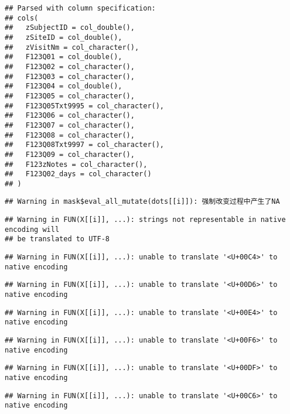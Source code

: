 \documentclass[
]{article}
\begin{document}
\begin{verbatim}
## Parsed with column specification:
## cols(
##   zSubjectID = col_double(),
##   zSiteID = col_double(),
##   zVisitNm = col_character(),
##   F123Q01 = col_double(),
##   F123Q02 = col_character(),
##   F123Q03 = col_character(),
##   F123Q04 = col_double(),
##   F123Q05 = col_character(),
##   F123Q05Txt9995 = col_character(),
##   F123Q06 = col_character(),
##   F123Q07 = col_character(),
##   F123Q08 = col_character(),
##   F123Q08Txt9997 = col_character(),
##   F123Q09 = col_character(),
##   F123zNotes = col_character(),
##   F123Q02_days = col_character()
## )
\end{verbatim}

\begin{verbatim}
## Warning in mask$eval_all_mutate(dots[[i]]): 强制改变过程中产生了NA
\end{verbatim}

\begin{verbatim}
## Warning in FUN(X[[i]], ...): strings not representable in native encoding will
## be translated to UTF-8
\end{verbatim}

\begin{verbatim}
## Warning in FUN(X[[i]], ...): unable to translate '<U+00C4>' to native encoding
\end{verbatim}

\begin{verbatim}
## Warning in FUN(X[[i]], ...): unable to translate '<U+00D6>' to native encoding
\end{verbatim}

\begin{verbatim}
## Warning in FUN(X[[i]], ...): unable to translate '<U+00E4>' to native encoding
\end{verbatim}

\begin{verbatim}
## Warning in FUN(X[[i]], ...): unable to translate '<U+00F6>' to native encoding
\end{verbatim}

\begin{verbatim}
## Warning in FUN(X[[i]], ...): unable to translate '<U+00DF>' to native encoding
\end{verbatim}

\begin{verbatim}
## Warning in FUN(X[[i]], ...): unable to translate '<U+00C6>' to native encoding
\end{verbatim}
\end{document}
